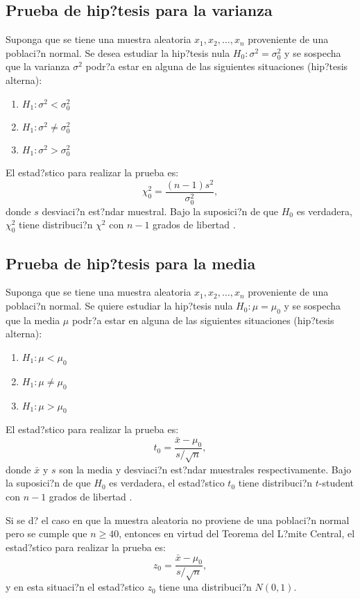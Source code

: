 \documentclass[]{comunicaciones}
\begin{document}
\subsection{Prueba de hip?tesis para la varianza}
Suponga que se tiene una muestra aleatoria $x_1, x_2, \ldots, x_n$ proveniente de una poblaci?n normal. Se desea estudiar la hip?tesis nula $H_0: \sigma^2 = \sigma_0^2$ y se sospecha que la varianza $\sigma^2$ podr?a estar en alguna de las siguientes situaciones (hip?tesis alterna):
\begin{enumerate}
	\item $H_1: \sigma^2 < \sigma_0^2$
	\item $H_1: \sigma^2 \neq \sigma_0^2$
	\item $H_1: \sigma^2 > \sigma_0^2$
\end{enumerate}
El estad?stico para realizar la prueba es:
$$\chi_0^2=\frac{(n-1) s^2}{\sigma_0^2},$$
donde $s$ desviaci?n est?ndar muestral. Bajo la suposici?n de que $H_0$ es verdadera, $\chi_0^2$ tiene distribuci?n $\chi^2$ con $n-1$ grados de libertad \cite{Montgomery03}.

\subsection{Prueba de hip?tesis para la media}
Suponga que se tiene una muestra aleatoria $x_1, x_2, \ldots, x_n$ proveniente de una poblaci?n normal. Se quiere estudiar la hip?tesis nula $H_0: \mu = \mu_0$ y se sospecha que la media $\mu$ podr?a estar en alguna de las siguientes situaciones (hip?tesis alterna):
\begin{enumerate}
	 \item $H_1: \mu < \mu_0$
	 \item $H_1: \mu \neq \mu_0$
	 \item $H_1: \mu > \mu_0$
\end{enumerate}
El estad?stico para realizar la prueba es:
$$t_0=\frac{\bar{x} - \mu_0}{s/\sqrt{n}},$$
donde $\bar{x}$ y $s$ son la media y desviaci?n est?ndar muestrales respectivamente. Bajo la suposici?n de que $H_0$ es verdadera, el estad?stico $t_0$ tiene distribuci?n $t$-student con $n-1$ grados de libertad \cite{Walpole12}.

Si se d? el caso en que la muestra aleatoria no proviene de una poblaci?n normal pero se cumple que $n \geq 40$, entonces en virtud del Teorema del L?mite Central, el estad?stico para realizar la prueba es:
$$z_0=\frac{\bar{x} - \mu_0}{s/\sqrt{n}},$$
y en esta situaci?n el estad?stico $z_0$ tiene una distribuci?n $N(0, 1)$. 
\end{document}
